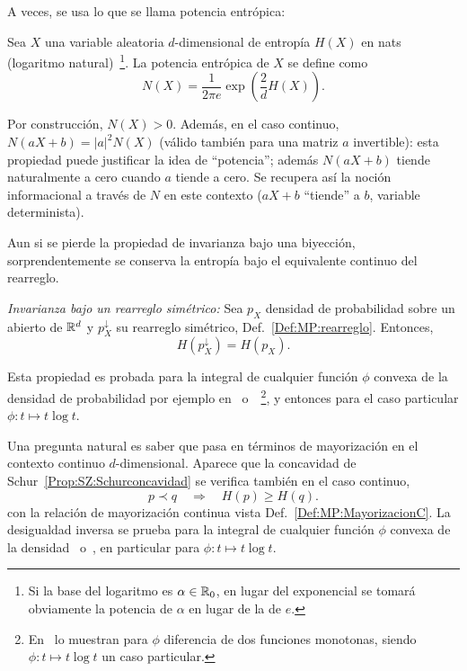 A veces, se usa lo que se llama potencia entr\'opica:
%
\begin{definicion}
\label{Def:SZ:PotenciaEntropica}
%
  Sea $X$  una variable aleatoria  $d$-dimensional de entrop\'ia $H(X)$  en nats
  (logaritmo     natural)~\footnote{Si    la     base    del     logaritmo    es
  $\alpha  \in \mathbb{R}_0$,  en lugar  del  exponencial se  tomar\'a obviamente  la
  potencia de $\alpha$ en  lugar de la de $e$.}. La  potencia entr\'opica de $X$
  se define como
  \[
  N(X) = \frac{1}{2 \pi e} \exp\left( \frac2d H(X) \right).
  \]
\end{definicion}
%
\noindent Por construcci\'on,  $N(X) >  0$.  Adem\'as,  en el caso  continuo,
$N(a X+b)  = |a|^2 N(X)$  (v\'alido tambi\'en  para una matriz  $a$ invertible):
esta propiedad  puede justificar  la idea de  ``potencia''; adem\'as  $N(a X+b)$
tiende  naturalmente a  cero cuando  $a$ tiende  a cero.   Se recupera  as\'i la
noci\'on informacional a trav\'es de $N$ en  este contexto ($a X + b$ ``tiende''
a $b$, variable determinista).

Aun   si  se   pierde  la   propiedad  de   invarianza  bajo   una  biyecci\'on,
sorprendentemente se  conserva la  entrop\'ia bajo  el equivalente  continuo del
rearreglo.

\begin{propiedadesC}\setcounter{enumi}{\value{PropPermutacion}}
\item\label{Prop:SZ:permutacionC} {\it Invarianza  bajo un rearreglo sim\'etrico:}
Sea  $p_X$   densidad  de   probabilidad  sobre  un   abierto  de   $\mathbb{R}^d$  y
$p_X^\downarrow$ su rearreglo sim\'etrico, Def.~\ref{Def:MP:rearreglo}. Entonces,
  \[
  H\left( p_X^\downarrow \right) = H(p_X).
  \]
\end{propiedadesC}
%
\noindent
Esta propiedad es probada para la integral de cualquier funci\'on $\phi$ convexa
de    la   densidad    de    probabilidad    por   ejemplo    en~\cite{LieLos01}
o~\cite[Lema~7.2]{WanMad04}~\footnote{En~\cite[Sec.~3.3]{LieLos01}  lo  muestran
para  $\phi$ diferencia  de dos  funciones  monotonas, siendo  $\phi: t  \mapsto
t  \log t$  un caso  particular.},  y entonces  para el  caso particular  $\phi:
t \mapsto t \log t$.

Una pregunta  natural es saber  que pasa en  t\'erminos de mayorizaci\'on  en el
contexto   continuo    $d$-dimensional.    Aparece   que   la    concavidad   de
Schur~\ref{Prop:SZ:Schurconcavidad} se verifica tambi\'en en el caso continuo,
\ie
%
\[
p \prec  q  \quad \Rightarrow  \quad H(p)  \ge H(q).
\]
%
con      la      relaci\'on      de      mayorizaci\'on      continua      vista
Def.~\ref{Def:MP:MayorizacionC}.   La  desigualdad  inversa se  prueba  para  la
integral  de  cualquier funci\'on  $\phi$  convexa  de la  densidad~\cite{Cho74}
o~\cite[Prop.~7.3]{WanMad04}, en particular para $\phi: t \mapsto t \log t$.

